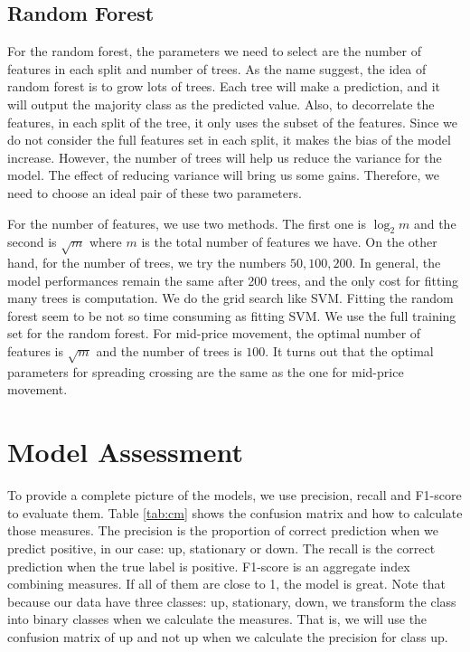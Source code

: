 \documentclass[11pt]{article}
\begin{document}
\subsection{Random Forest}
For the random forest, the parameters we need to select are the number of features in each split and number of trees. As the name suggest, the idea of random forest is to grow lots of trees. Each tree will make a prediction, and it will output the majority class as the predicted value. Also, to decorrelate the features, in each split of the tree, it only uses the subset of the features. Since we do not consider the full features set in each split, it makes the bias of the model increase. However, the number of trees will help us reduce the variance for the model. The effect of reducing variance will bring us some gains. Therefore, we need to choose an ideal pair of these two parameters.

For the number of features, we use two methods. The first one is $\log_2 m$ and the second is $\sqrt{m}$ where $m$ is the total number of features we have. On the other hand, for the number of trees, we try the numbers $50, 100, 200$. In general, the model performances remain the same after 200 trees, and the only cost for fitting many trees is computation. We do the grid search like SVM. Fitting the random forest seem to be not so time consuming as fitting SVM. We use the full training set for the random forest. For mid-price movement, the optimal number of features is $\sqrt{m}$ and the number of trees is $100$. It turns out that the optimal parameters for spreading crossing are the same as the one for mid-price movement.



\section{Model Assessment} \label{modelassessment}
To provide a complete picture of the models, we use precision, recall and F1-score to evaluate them. Table \ref{tab:cm} shows the confusion matrix and how to calculate those measures. The precision is the proportion of correct prediction when we predict positive, in our case: up, stationary or down. The recall is the correct prediction when the true label is positive. F1-score is an aggregate index combining measures. If all of them are close to 1, the model is great. Note that because our data have three classes: up, stationary, down, we transform the class into binary classes when we calculate the measures. That is, we will use the confusion matrix of up and not up when we calculate the precision for class up.
\end{document}
